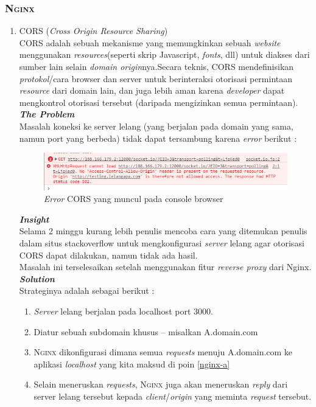\subsubsection{\textsc{Nginx}}

\begin{enumerate}
	\item CORS (\textit{Cross Origin Resource Sharing})
	\\
	CORS adalah sebuah mekanisme yang memungkinkan  sebuah \textit{website} menggunakan \textit{resources}(seperti skrip Javascript, \textit{fonts}, dll) untuk diakses dari sumber lain selain \textit{domain origin}nya.Secara teknis, CORS mendefinisikan \textit{protokol}/cara browser dan server untuk berinteraksi otorisasi permintaan \textit{resource} dari domain lain, dan juga lebih aman karena \textit{developer} dapat mengkontrol otorisasi tersebut (daripada mengizinkan semua permintaan).\\
	
	\textbf{\textit{The Problem}} \\
	Masalah koneksi ke server lelang (yang berjalan pada domain yang sama, namun port yang berbeda) tidak dapat tersambung karena \textit{error} berikut :


	\begin{figure}[H]
		\centering
		\includegraphics[width=\textwidth]{images/bab4/pl/madafaka_cors.png}
		\caption{\textit{Error} CORS yang muncul pada console browser}
		\label{cors}
	\end{figure}
	
	
	\textbf{\textit{Insight}} \\
	Selama 2 minggu kurang lebih penulis mencoba cara yang ditemukan penulis dalam situs stackoverflow untuk mengkonfigurasi \textit{server} lelang agar otorisasi CORS dapat dilakukan, namun tidak ada hasil.\\
	\indent Masalah ini terselesaikan setelah menggunakan fitur \textit{reverse proxy} dari Nginx.\\
	
	\textbf{\textit{Solution}} \\
	\indentenum Strateginya adalah sebagai berikut :
	\begin{enumerate}
		\item \label{nginx-a} \textit{Server} lelang berjalan pada localhost port 3000.
		\item \label{nginx-b} Diatur sebuah subdomain khusus -- misalkan A.domain.com
		\item \textsc{Nginx} dikonfigurasi dimana semua \textit{requests} menuju A.domain.com ke aplikasi \textit{localhost} yang kita maksud di poin \ref{nginx-a}
		\item Selain meneruskan \textit{requests}, \textsc{Nginx} juga akan meneruskan \textit{reply} dari server lelang tersebut kepada \textit{client}/\textit{origin} yang meminta \textit{request} tersebut.				
	\end{enumerate}
\end{enumerate}
